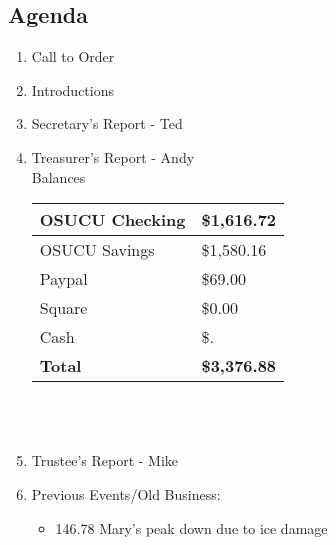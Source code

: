 \documentclass[letter,11pt]{extarticle}
\begin{document}
	\subsection*{Agenda}
	\begin{enumerate}
		\item Call to Order
		\item Introductions
		\item Secretary's Report - Ted
		\item Treasurer's Report - Andy \\
				Balances 
			\begin{tabular}{|l|l|} \hline
				OSUCU Checking & \$1,616.72 \\ \hline
				OSUCU Savings & \$1,580.16 \\ \hline
				Paypal & \$69.00 \\ \hline
				Square & \$0.00 \\ \hline
				Cash & \$. \\ \hline
				\textbf{Total} & \textbf{\$3,376.88} \\ \hline
			\end{tabular} \\ \\
		\item Trustee's Report - Mike
		\item Previous Events/Old Business:
		\begin{itemize}
			\item 146.78 Mary's peak down due to ice damage
		\end{itemize}
			

\end{enumerate}
\end{document}
